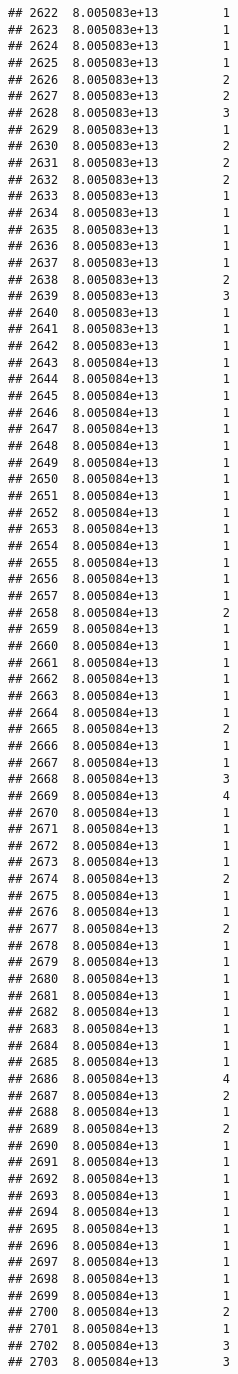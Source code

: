\documentclass[
]{article}
\begin{document}
\begin{verbatim}
## 2622  8.005083e+13         1
## 2623  8.005083e+13         1
## 2624  8.005083e+13         1
## 2625  8.005083e+13         1
## 2626  8.005083e+13         2
## 2627  8.005083e+13         2
## 2628  8.005083e+13         3
## 2629  8.005083e+13         1
## 2630  8.005083e+13         2
## 2631  8.005083e+13         2
## 2632  8.005083e+13         2
## 2633  8.005083e+13         1
## 2634  8.005083e+13         1
## 2635  8.005083e+13         1
## 2636  8.005083e+13         1
## 2637  8.005083e+13         1
## 2638  8.005083e+13         2
## 2639  8.005083e+13         3
## 2640  8.005083e+13         1
## 2641  8.005083e+13         1
## 2642  8.005083e+13         1
## 2643  8.005084e+13         1
## 2644  8.005084e+13         1
## 2645  8.005084e+13         1
## 2646  8.005084e+13         1
## 2647  8.005084e+13         1
## 2648  8.005084e+13         1
## 2649  8.005084e+13         1
## 2650  8.005084e+13         1
## 2651  8.005084e+13         1
## 2652  8.005084e+13         1
## 2653  8.005084e+13         1
## 2654  8.005084e+13         1
## 2655  8.005084e+13         1
## 2656  8.005084e+13         1
## 2657  8.005084e+13         1
## 2658  8.005084e+13         2
## 2659  8.005084e+13         1
## 2660  8.005084e+13         1
## 2661  8.005084e+13         1
## 2662  8.005084e+13         1
## 2663  8.005084e+13         1
## 2664  8.005084e+13         1
## 2665  8.005084e+13         2
## 2666  8.005084e+13         1
## 2667  8.005084e+13         1
## 2668  8.005084e+13         3
## 2669  8.005084e+13         4
## 2670  8.005084e+13         1
## 2671  8.005084e+13         1
## 2672  8.005084e+13         1
## 2673  8.005084e+13         1
## 2674  8.005084e+13         2
## 2675  8.005084e+13         1
## 2676  8.005084e+13         1
## 2677  8.005084e+13         2
## 2678  8.005084e+13         1
## 2679  8.005084e+13         1
## 2680  8.005084e+13         1
## 2681  8.005084e+13         1
## 2682  8.005084e+13         1
## 2683  8.005084e+13         1
## 2684  8.005084e+13         1
## 2685  8.005084e+13         1
## 2686  8.005084e+13         4
## 2687  8.005084e+13         2
## 2688  8.005084e+13         1
## 2689  8.005084e+13         2
## 2690  8.005084e+13         1
## 2691  8.005084e+13         1
## 2692  8.005084e+13         1
## 2693  8.005084e+13         1
## 2694  8.005084e+13         1
## 2695  8.005084e+13         1
## 2696  8.005084e+13         1
## 2697  8.005084e+13         1
## 2698  8.005084e+13         1
## 2699  8.005084e+13         1
## 2700  8.005084e+13         2
## 2701  8.005084e+13         1
## 2702  8.005084e+13         3
## 2703  8.005084e+13         3

\end{verbatim}
\end{document}
